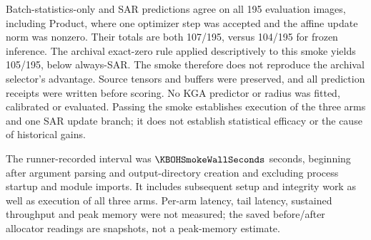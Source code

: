 Batch-statistics-only and SAR predictions agree on all 195 evaluation images,
including Product, where one optimizer step was accepted and the affine update norm
was nonzero. Their totals are both 107/195, versus 104/195 for frozen inference.
The archival exact-zero rule applied descriptively to this smoke yields 105/195,
below always-SAR. The smoke therefore does not reproduce the archival selector's
advantage. Source tensors and buffers were preserved, and all prediction receipts
were written before scoring. No KGA predictor or radius was fitted, calibrated or
evaluated. Passing the smoke establishes execution of the three arms and one SAR
update branch; it does not establish statistical efficacy or the cause of historical gains.

The runner-recorded interval was $\KBOHSmokeWallSeconds$ seconds, beginning after
argument parsing and output-directory creation and excluding process startup and
module imports. It includes subsequent setup and integrity work as well as execution
of all three arms. Per-arm latency,
tail latency, sustained throughput and peak memory were not measured; the saved
before/after allocator readings are snapshots, not a peak-memory estimate.
